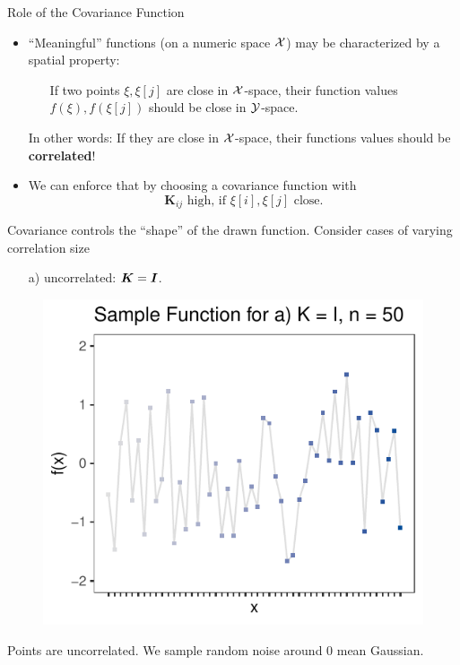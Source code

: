 \documentclass[11pt,compress,t,notes=noshow, xcolor=table]{beamer}
\begin{document}
\begin{vbframe}{Role of the Covariance Function}

\begin{itemize}
  \item \enquote{Meaningful} functions (on a numeric space $\mathcal{X}$) may be characterized by a spatial property: \vspace*{0.2cm}
  \begin{itemize}
    \item[] If two points $\xi, \xi[j]$ are close in $\mathcal{X}$-space, their function values $f(\xi), f(\xi[j])$ should be close in $\mathcal{Y}$-space.
  \end{itemize} \vspace*{0.2cm}
  In other words: If they are close in $\mathcal{X}$-space, their functions values should be \textbf{correlated}! \vspace*{0.4cm}
  \item We can enforce that by choosing a covariance function with
  $$
    \bm{K}_{ij} \text{ high, if } \xi[i], \xi[j] \text{ close.}
  $$
  \end{itemize}

\framebreak

Covariance controls the \enquote{shape} of the drawn function. Consider cases of varying correlation size
\vspace{10pt}

\begin{enumerate}
  \item[a)] uncorrelated: $\bm{K} = \boldsymbol{I}$.
\end{enumerate}

\begin{figure}
  \includegraphics[width=0.45\linewidth]{figure/discrete/example_extreme_50_1.pdf}
\end{figure}

Points are uncorrelated. We sample random noise around 0 mean Gaussian.

\end{vbframe}
\end{document}
